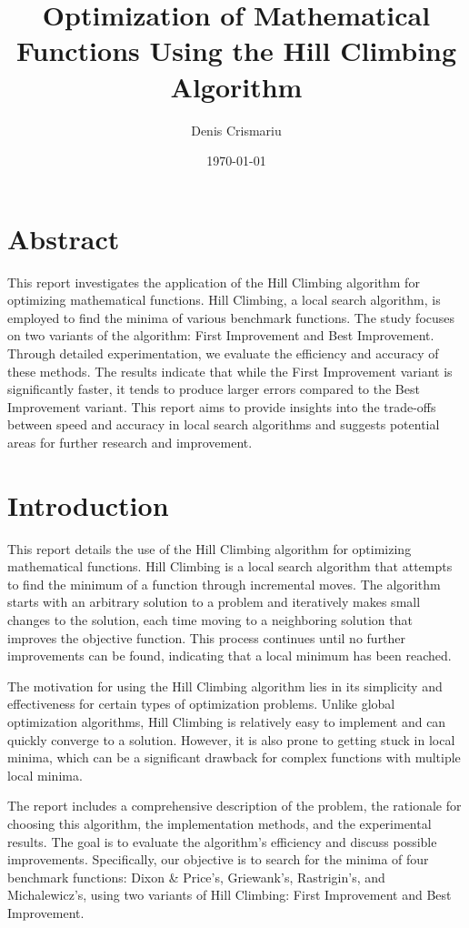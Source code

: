 \documentclass{article}
\title{Optimization of Mathematical Functions Using the Hill Climbing Algorithm}
\author{Denis Crismariu}
\date{\today}
\begin{document}
\maketitle

\section{Abstract}
This report investigates the application of the Hill Climbing algorithm for optimizing mathematical functions. Hill Climbing, a local search algorithm, is employed to find the minima of various benchmark functions. The study focuses on two variants of the algorithm: First Improvement and Best Improvement. Through detailed experimentation, we evaluate the efficiency and accuracy of these methods. The results indicate that while the First Improvement variant is significantly faster, it tends to produce larger errors compared to the Best Improvement variant. This report aims to provide insights into the trade-offs between speed and accuracy in local search algorithms and suggests potential areas for further research and improvement.

\section{Introduction}
This report details the use of the Hill Climbing algorithm for optimizing mathematical functions. Hill Climbing is a local search algorithm that attempts to find the minimum of a function through incremental moves. The algorithm starts with an arbitrary solution to a problem and iteratively makes small changes to the solution, each time moving to a neighboring solution that improves the objective function. This process continues until no further improvements can be found, indicating that a local minimum has been reached.

The motivation for using the Hill Climbing algorithm lies in its simplicity and effectiveness for certain types of optimization problems. Unlike global optimization algorithms, Hill Climbing is relatively easy to implement and can quickly converge to a solution. However, it is also prone to getting stuck in local minima, which can be a significant drawback for complex functions with multiple local minima.

The report includes a comprehensive description of the problem, the rationale for choosing this algorithm, the implementation methods, and the experimental results. The goal is to evaluate the algorithm's efficiency and discuss possible improvements. Specifically, our objective is to search for the minima of four benchmark functions: Dixon \& Price’s, Griewank’s, Rastrigin’s, and Michalewicz’s, using two variants of Hill Climbing: First Improvement and Best Improvement.
\end{document}
